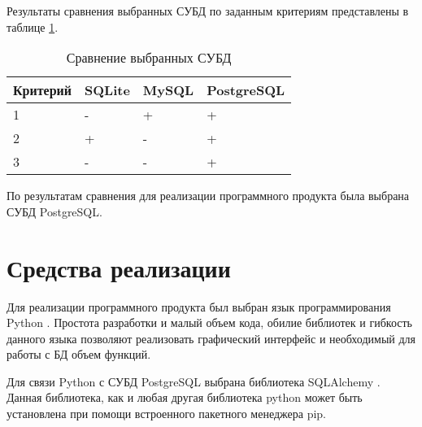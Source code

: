 Результаты сравнения выбранных СУБД по заданным критериям представлены в таблице \ref{tbl:compare_DBMS}.


\begin{table}[ht!]
	\centering
	\caption{Сравнение выбранных СУБД}
	\label{tbl:compare_DBMS}
	\begin{tabular}{|l|l|l|l|}
		\hline
		\textbf{Критерий} & \textbf{SQLite}& \textbf{MySQL} & \textbf{PostgreSQL}  \\ \hline
		
		1 & - & + & + \\ \hline
		2 & + & - & + \\ \hline
		3 & - & - & +  \\ \hline
		
	\end{tabular}
\end{table}

По результатам сравнения для реализации программного продукта была выбрана СУБД PostgreSQL.

\section{Средства реализации}

Для реализации программного продукта был выбран язык программирования Python \cite{python}. Простота разработки и малый объем кода, обилие библиотек и гибкость данного языка позволяют реализовать графический интерфейс и необходимый для работы с БД объем функций. 

Для связи Python с СУБД PostgreSQL выбрана библиотека SQLAlchemy \cite{sqlalch}. Данная библиотека, как и любая другая библиотека python может быть установлена при помощи встроенного пакетного менеджера pip.


%
%

%

